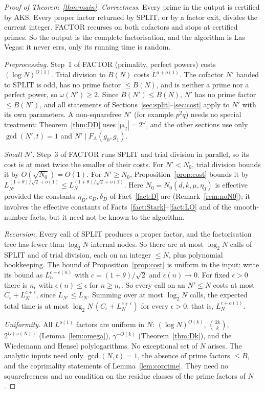 \documentclass[11pt]{amsart}
\theoremstyle{definition}
\newcommand{\bmu}{\boldsymbol{\mu}_2}
\begin{document}
\begin{proof}[Proof of Theorem~\ref{thm:main}]
\emph{Correctness.} Every prime in the output is certified by AKS. Every proper factor returned by SPLIT, or by a factor exit,
divides the current integer. FACTOR recurses on both cofactors and stops at certified primes. So the output is the complete
factorisation, and the algorithm is Las Vegas: it never errs, only its running time is random.

\emph{Preprocessing.} Step~1 of FACTOR (primality, perfect powers) costs $(\log N)^{O(1)}$. Trial division to $B(N)$ costs $L^{a+o(1)}$. The cofactor
$N'$ handed to SPLIT is odd, has no prime factor $\le B(N)$, and is neither a prime nor a perfect power, so $\omega(N')\ge2$. Since
$B(N')\le B(N)$, $N'$ has no prime factor $\le B(N')$, and all statements of Sections~\ref{sec:split}--\ref{sec:cost} apply to $N'$ with its own
parameters. A non-squarefree $N'$ (for example $p^2q$) needs no special treatment: Theorem~\ref{thm:DD} uses $|\bmu|=2^{\omega}$, and the other
sections use only $\gcd(N',t)=1$ and $N'\mid F_A(g_0,g_1)$.

\emph{Small $N'$.} Step~3 of FACTOR runs SPLIT and trial division in parallel, so its cost is at most twice the smaller of their costs. For
$N'<N_0$, trial division bounds it by $O(\sqrt{N_0})=O(1)$. For $N'\ge N_0$, Proposition~\ref{prop:cost} bounds it by
$L_{N'}^{(1+\theta)/\sqrt2+o(1)}\le L_N^{(1+\theta)/\sqrt2+o(1)}$. Here $N_0=N_0(d,k,\mu,\eta_0)$ is effective provided the constants $\eta_D,c_D,\delta_D$ of Fact~\ref{fact:D} are (Remark~\ref{rem:noN0});
it involves the effective constants of
Facts~\ref{fact:Stark}--\ref{fact:LO} and of the smooth-number facts, but it need not be known to the algorithm.

\emph{Recursion.} Every call of SPLIT produces a proper factor, and the factorisation tree has fewer than $\log_2N$ internal nodes. So
there are at most $\log_2N$ calls of SPLIT and of trial division, each on an integer $\le N$, plus polynomial bookkeeping. The bound of
Proposition~\ref{prop:cost} is uniform in the input: write its bound as $L_n^{c+\epsilon(n)}$ with $c=(1+\theta)/\sqrt2$ and $\epsilon(n)\to0$. For
fixed $\epsilon>0$ there is $n_\epsilon$ with $\epsilon(n)\le\epsilon$ for $n\ge n_\epsilon$. So every call on an $N'\le N$ costs at most
$C_\epsilon+L_N^{c+\epsilon}$, since $L_{N'}\le L_N$. Summing over at most $\log_2N$ calls, the expected total time is at most
$\log_2N\,(C_\epsilon+L_N^{c+\epsilon})$ for every $\epsilon>0$, that is, $L_N^{c+o(1)}$.

\emph{Uniformity.} All $L^{o(1)}$ factors are uniform in $N$: $(\log N)^{O(k)}$, $\binom{2k}k$, $2^{O(\omega(N))}$ (Lemma~\ref{lem:omega}),
$\gamma^{-O(k)}$ (Theorem~\ref{thm:Dk}), and the Wiedemann and Hensel polylogarithms. No exceptional set of $N$ arises. The analytic inputs need
only $\gcd(N,t)=1$, the absence of prime factors $\le B$, and the coprimality statements of Lemma~\ref{lem:coprime}. They need no squarefreeness
and no condition on the residue classes of the prime factors of $N$.
\end{proof}
\end{document}
